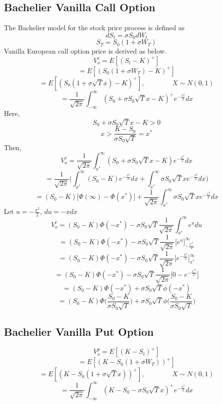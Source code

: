 \documentclass{article}
\begin{document}
\subsection{Bachelier Vanilla Call Option}
The Bachelier model for the stock price process is defined as
$$
dS_t = \sigma S_0dW_t
$$$$
S_T = S_0(1 + \sigma W_T)
$$
Vanilla European call option price is derived as below.
$$
V_o^{c} = {E}[(S_t-K)^{+}]
$$$$
= {E}[(S_0(1 + \sigma W_T)-K)^{+}]
$$$$
= {E}[(S_0(1 + \sigma \sqrt{T}x)-K)^{+}],\qquad \qquad X\sim N(0, 1)
$$$$
= \frac{1}{\sqrt{2\pi}}\int_{-\infty}^{\infty}(S_0 + \sigma S_0\sqrt{T}x-K)^{+}e^{-\frac{x^{2}}{2}}dx
$$
Here,
$$
S_0 + \sigma S_0\sqrt{T}x -K>0
$$$$
x > \frac{K-S_0}{\sigma S_0\sqrt{T}} = x^{*}
$$
Then,
$$
V_o^{c} = \frac{1}{\sqrt{2\pi}}\int_{x^{*}}^{\infty}(S_0 + \sigma S_0\sqrt{T}x-K)e^{-\frac{x^{2}}{2}}dx
$$$$
= \frac{1}{\sqrt{2\pi}}\Bigg(\int_{x^{*}}^{\infty}(S_0-K)e^{-\frac{x^{2}}{2}}dx +  \int_{x^{*}}^{\infty} \sigma S_0\sqrt{T}xe^{-\frac{x^{2}}{2}}dx\Bigg)
$$$$
= (S_0-K)\Big[\Phi(\infty)-\Phi(x^{*})\Big] + \frac{1}{\sqrt{2\pi}}\int_{x^{*}}^{\infty}\sigma S_0\sqrt{T}xe^{-\frac{x^{2}}{2}}dx
$$
Let $ u = -\frac{x^{2}}{2} $, $du = -xdx$
$$
V_o^{c}= (S_0-K)\Phi(-x^{*}) - \sigma S_0\sqrt{T}\frac{1}{\sqrt{2\pi}}\int_{x^{*}}^{\infty}e^{u}du
$$$$
= (S_0-K)\Phi(-x^{*}) - \sigma S_0\sqrt{T}\frac{1}{\sqrt{2\pi}}\big[e^{u}\big]_{-\frac{x^{{*}^{2}}}{2}}^\infty
$$$$
= (S_0-K)\Phi(-x^{*}) - \sigma S_0\sqrt{T}\frac{1}{\sqrt{2\pi}}\big[e^{-\frac{x^{2}}{2}}\big]_{x^{*}}^\infty
$$$$
= (S_0-K)\Phi(-x^{*}) - \sigma S_0\sqrt{T}\frac{1}{\sqrt{2\pi}}\Big[0-e^{-\frac{x^{{*}{2}}}{2}}\Big]
$$$$
= (S_0-K)\Phi(-x^{*}) + \sigma S_0\sqrt{T}\phi(-x^{*})
$$
$$
= (S_0-K)\Phi\bigg(\frac{S_0-K}{\sigma S_0\sqrt{T}}\bigg) + \sigma S_0\sqrt{T}\phi\bigg(\frac{S_0-K}{\sigma S_0\sqrt{T}}\bigg)
$$

\subsection{Bachelier Vanilla Put Option}
$$
V_o^{p} = {E}[(K-S_t)^{+}]
$$$$
= {E}[(K-S_0(1 + \sigma W_T))^{+}]
$$$$
= {E}[(K-S_0(1 + \sigma \sqrt{T}x))^{+}],\qquad \qquad X\sim N(0, 1)
$$$$
= \frac{1}{\sqrt{2\pi}}\int_{-\infty}^{\infty}(K-S_0 - \sigma S_0\sqrt{T}x)^{+}e^{-\frac{x^{2}}{2}}dx
$$
\end{document}
